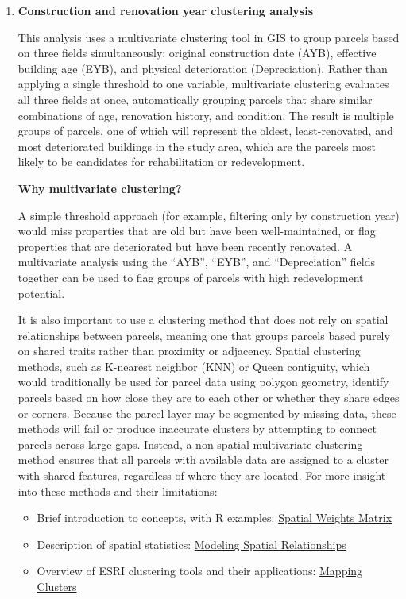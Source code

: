 \documentclass[
  letterpaper,
  DIV=11,
  numbers=noendperiod]{scrreprt}
\providecommand{\tightlist}{%
  \setlength{\itemsep}{0pt}\setlength{\parskip}{0pt}}
\begin{document}
\begin{enumerate}
\def\labelenumi{\arabic{enumi}.}
\item
  \textbf{Construction and renovation year clustering analysis}

  This analysis uses a multivariate clustering tool in GIS to group
  parcels based on three fields simultaneously: original construction
  date (AYB), effective building age (EYB), and physical deterioration
  (Depreciation). Rather than applying a single threshold to one
  variable, multivariate clustering evaluates all three fields at once,
  automatically grouping parcels that share similar combinations of age,
  renovation history, and condition. The result is multiple groups of
  parcels, one of which will represent the oldest, least-renovated, and
  most deteriorated buildings in the study area, which are the parcels
  most likely to be candidates for rehabilitation or redevelopment.

  \textbf{Why multivariate clustering?}

  A simple threshold approach (for example, filtering only by
  construction year) would miss properties that are old but have been
  well-maintained, or flag properties that are deteriorated but have
  been recently renovated. A multivariate analysis using the ``AYB'',
  ``EYB'', and ``Depreciation'' fields together can be used to flag
  groups of parcels with high redevelopment potential.

  It is also important to use a clustering method that does not rely on
  spatial relationships between parcels, meaning one that groups parcels
  based purely on shared traits rather than proximity or adjacency.
  Spatial clustering methods, such as K-nearest neighbor (KNN) or Queen
  contiguity, which would traditionally be used for parcel data using
  polygon geometry, identify parcels based on how close they are to each
  other or whether they share edges or corners. Because the parcel layer
  may be segmented by missing data, these methods will fail or produce
  inaccurate clusters by attempting to connect parcels across large
  gaps. Instead, a non-spatial multivariate clustering method ensures
  that all parcels with available data are assigned to a cluster with
  shared features, regardless of where they are located. For more
  insight into these methods and their limitations:

  \begin{itemize}
  \tightlist
  \item
    Brief introduction to concepts, with R examples:
    \href{https://cran.r-project.org/web/packages/geostan/vignettes/spatial-weights-matrix.html}{Spatial
    Weights Matrix}
  \item
    Description of spatial statistics:
    \href{https://doc.esri.com/en/arcgis-pro/latest/tool-reference/spatial-statistics/modeling-spatial-relationships.html}{Modeling
    Spatial Relationships}
  \item
    Overview of ESRI clustering tools and their applications:
    \href{https://doc.esri.com/en/arcgis-pro/latest/tool-reference/spatial-statistics/an-overview-of-the-mapping-clusters-toolset.html}{Mapping
    Clusters}
  \end{itemize}


\end{enumerate}
\end{document}

